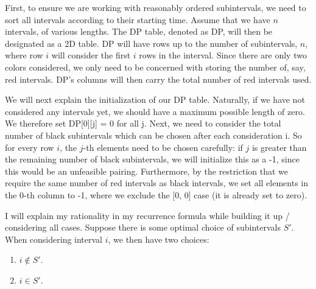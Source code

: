 \begin{solution}

    First, to ensure we are working with reasonably ordered subintervals, we need to sort all intervals according to their starting time. Assume that we have $n$ intervals, of various lengths. The DP table, denoted as DP, will then be designated as a 2D table. DP will have rows up to the number of subintervals, $n$, where row $i$ will consider the first $i$ rows in the interval. Since there are only two colors considered, we only need to be concerned with storing the number of, say, red intervals. DP's columns will then carry the total number of red intervals used. \par

    \hop
    We will next explain the initialization of our DP table. Naturally, if we have not considered any intervals yet, we should have a maximum possible length of zero. We therefore set DP[0][j] = 0 for all j. Next, we need to consider the total number of black subintervals which can be chosen after each consideration i. So for every row $i$, the $j$-th elements need to be chosen carefully: if $j$ is greater than the remaining number of black subintervals, we will initialize this as a -1, since this would be an unfeasible pairing. Furthermore, by the restriction that we require the same number of red intervals as black intervals, we set all elements in the 0-th column to -1, where we exclude the [0, 0] case (it is already set to zero). \par

    \newpage
    I will explain my rationality in my recurrence formula while building it up / considering all cases. Suppose there is some optimal choice of subintervals $S'$. When considering interval $i$, we then have two choices:
    \begin{enumerate}
        \item $i \not \in S'$.
        \item $i \in S'$.
    \end{enumerate}


\end{solution}
